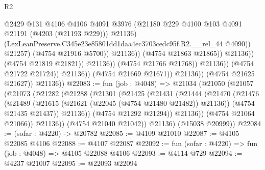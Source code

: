 \begin{lexlean}{R2}
\begin{coremodule}
                                                    @2429
                                                    @131
                                                    @4106
                                                    @4106
                                                    @4091
                                                    @3976
                                                    (@21180
                                                      @229
                                                      @4100
                                                      @103
                                                      @4091
                                                      @21191
                                                      (@4203 (@21193 @229)))
                                                    @21136)
                                                  (LexLeanPreserve.C345e23e85801dd1daa4ec3703cedc95f.R2.__rel_44
                                                    @4090))
                                                @21257)
                                              (@4754 @21916 @5700))
                                            @21136))
                                        (@4754 @21863 @21865))
                                      @21136))
                                  (@4754 @21819 @21821))
                                @21136))
                            (@4754 @21766 @21768))
                          @21136))
                      (@4754 @21722 @21724))
                    @21136))
                (@4754 @21669 @21671))
              @21136))
          (@4754 @21625 @21627))
        @21136))
@22083 := fun (job : @4048) =>
  @21034
    (@21050
      (@21057
        (@21073
          (@21282
            (@21288
              (@21301
                (@21425
                  (@21431
                    (@21444
                      (@21470
                        (@21476
                          (@21489
                            (@21615 (@21621 (@22045 (@4754 @21480 @21482)) @21136))
                            (@4754 @21435 @21437))
                          @21136))
                      (@4754 @21292 @21294))
                    @21136))
                (@4754 @21064 @21066))
              @21136))
          (@4754 @21040 @21042))
        @21136)
      (@15038 @20999))
@22084 := (sofar : @4220) -> @20782
@22085 := @4109 @21010
@22087 := @4105 @22085 @4106
@22088 := @4107 @22087
@22092 := fun (sofar : @4220) => fun (job : @4048) => @4105 @22088 @4106
@22093 := @4114 @729
@22094 := @4237 @21007
@22095 := @22093 @22094

\end{coremodule}
\end{lexlean}
